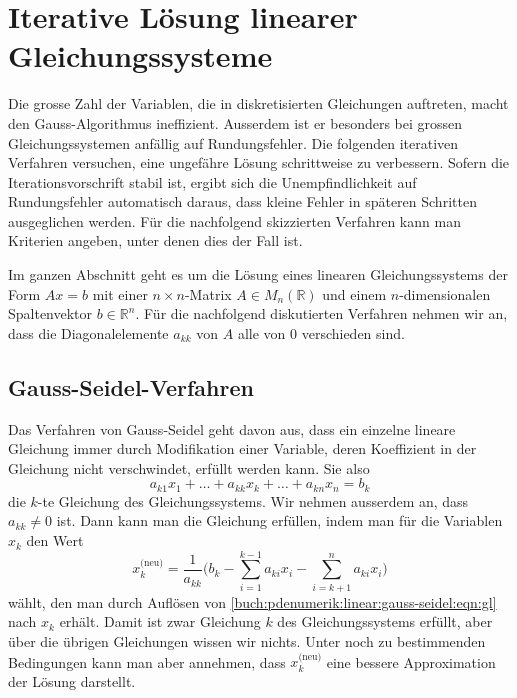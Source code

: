 \section{Iterative Lösung linearer Gleichungssysteme
\label{buch:pdenumerik:section:linear}}
Die grosse Zahl der Variablen, die in diskretisierten Gleichungen auftreten,
macht den Gauss-Algorithmus ineffizient.
Ausserdem ist er besonders bei grossen Gleichungssystemen anfällig auf
Rundungsfehler.
Die folgenden iterativen Verfahren versuchen, eine ungefähre Lösung
schrittweise zu verbessern.
Sofern die Iterationsvorschrift stabil ist, ergibt sich die Unempfindlichkeit
auf Rundungsfehler automatisch daraus, dass kleine Fehler in späteren
Schritten ausgeglichen werden.
Für die nachfolgend skizzierten Verfahren kann man Kriterien angeben,
unter denen dies der Fall ist.

Im ganzen Abschnitt geht es um die Lösung eines linearen Gleichungssystems
der Form $Ax=b$ mit einer $n\times n$-Matrix $A\in M_n(\mathbb{R})$ und
einem $n$-dimensionalen Spaltenvektor $b\in\mathbb{R}^n$.
Für die nachfolgend diskutierten Verfahren nehmen wir an, dass die
Diagonalelemente $a_{kk}$ von $A$ alle von $0$ verschieden sind.

%
%
\subsection{Gauss-Seidel-Verfahren
\label{buch:pdenumerik:linear:subsection:gauss-seidel}}
Das Verfahren von Gauss-Seidel geht davon aus, dass ein einzelne lineare
%
Gleichung immer durch Modifikation einer Variable, deren Koeffizient in
der Gleichung nicht verschwindet, erfüllt werden kann.
Sie also
\begin{equation}
a_{k1}x_1 + \dots + a_{kk}x_k + \dots + a_{kn}x_n = b_k
\label{buch:pdenumerik:linear:gauss-seidel:eqn:gl}
\end{equation}
die $k$-te Gleichung des Gleichungssystems.
Wir nehmen ausserdem an, dass $a_{kk}\ne 0$ ist.
Dann kann man die Gleichung erfüllen, indem man für die Variablen $x_k$
den Wert
\begin{equation}
x_k^{\text{(neu)}}
=
\frac{1}{a_{kk}}
\biggl(
b_k
-
\sum_{i=1}^{k-1}a_{ki}x_i
-
\sum_{i=k+1}^na_{ki}x_i
\biggr)
\label{buch:pdenumerik:linear:gauss-seidel:eqn:schritt}
\end{equation}
wählt, den man durch Auflösen von
\eqref{buch:pdenumerik:linear:gauss-seidel:eqn:gl}
nach $x_k$ erhält.
Damit ist zwar Gleichung $k$ des Gleichungssystems erfüllt, aber über die
übrigen Gleichungen wissen wir nichts.
Unter noch zu bestimmenden Bedingungen kann man aber annehmen, dass 
$x_k^{\text{(neu)}}$ eine bessere Approximation der Lösung darstellt.

